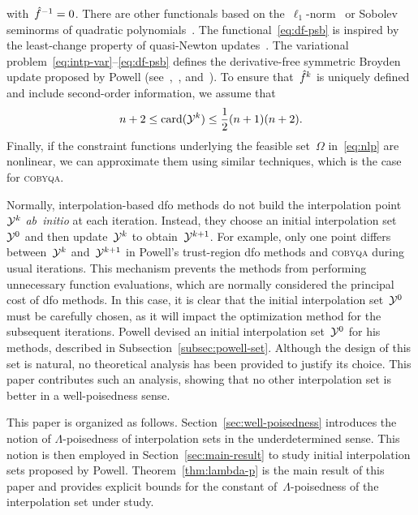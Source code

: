 \documentclass[draft]{article}
\numberwithin{equation}{section}
\theoremstyle{definition}
\theoremstyle{plain}
\theoremstyle{remark}
\DeclareMathOperator{\card}{card}
\newcommand*{\fset}{\Omega}
\newcommand*{\obj}{f}
\newcommand*{\objm}[1][]{\hat{\obj}\ifblank{#1}{}{^{#1}}}
\newcommand*{\solvername}[1]{\textsc{#1}\xspace}
\newcommand*{\xpt}[1][]{\mathcal{Y}\ifblank{#1}{}{^{#1}}}
\begin{document}
with~$\objm[-1] = 0$.
There are other functionals based on the~$\ell_1$-norm~\cite{Bandeira_Scheinberg_Vicente_2012} or Sobolev seminorms of quadratic polynomials~\cite{Zhang_2014,Xie_Yuan_2022}.
The functional~\eqref{eq:df-psb} is inspired by the least-change property of quasi-Newton updates~\cite{Dennis_Schnabel_1979}.
The variational problem~\eqref{eq:intp-var}--\eqref{eq:df-psb} defines the derivative-free symmetric
Broyden update proposed by Powell (see~\cite{Powell_2004a,Powell_2013},~\cite[\S~3.6]{Zhang_2012}, and~\cite[\S~2.4.2]{Ragonneau_2022}).
To ensure that~$\objm[k]$ is uniquely defined and include second-order information, we assume that
\begin{equation*}
    n + 2 \le \card(\xpt[k]) \le \frac{1}{2} (n + 1) (n + 2).
\end{equation*}
Finally, if the constraint functions underlying the feasible set~$\fset$ in~\eqref{eq:nlp} are nonlinear, we can approximate them using similar techniques, which is the case for \solvername{cobyqa}.

Normally, interpolation-based \gls{dfo} methods do not build the interpolation point~$\xpt[k]$ \emph{ab~initio} at each iteration.
Instead, they choose an initial interpolation set~$\xpt[0]$ and then  update~$\xpt[k]$ to obtain~$\xpt[k + 1]$.
For example, only one point differs between~$\xpt[k]$ and~$\xpt[k + 1]$ in Powell's trust-region \gls{dfo} methods and \solvername{cobyqa} during usual iterations.
This mechanism prevents the methods from performing unnecessary function evaluations, which are normally considered the principal cost of \gls{dfo} methods.
In this case, it is clear that the initial interpolation set~$\xpt[0]$ must be carefully chosen, as it will impact the optimization method for the subsequent iterations.
Powell devised an initial interpolation set~$\xpt[0]$ for his methods, described in Subsection~\ref{subsec:powell-set}.
Although the design of this set is natural, no theoretical analysis has been provided to justify its choice.
This paper contributes such an analysis, showing that no other interpolation set is better in a well-poisedness sense.

This paper is organized as follows.
Section~\ref{sec:well-poisedness} introduces the notion of $\Lambda$-poisedness of interpolation sets in the underdetermined sense.
This notion is then employed in Section~\ref{sec:main-result} to study initial interpolation sets proposed by Powell.
Theorem~\ref{thm:lambda-p} is the main result of this paper and provides explicit bounds for the constant of~$\Lambda$-poisedness of the interpolation set under study.
\end{document}
